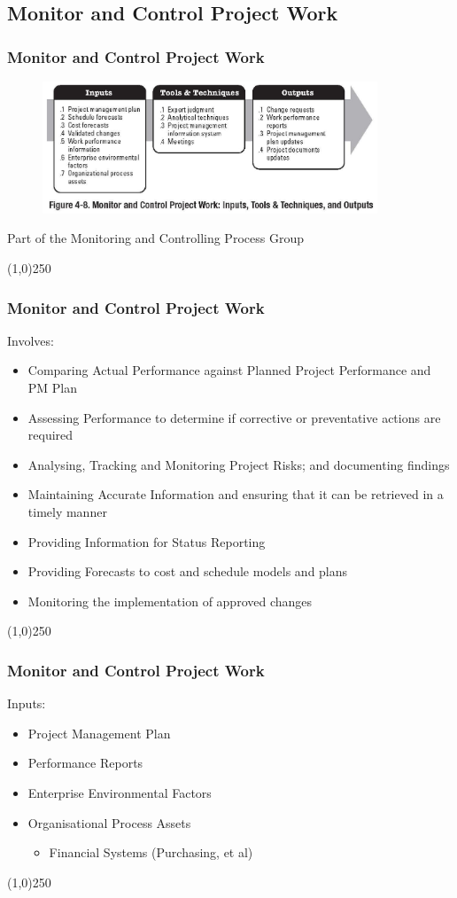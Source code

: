 \subsection{Monitor and Control Project Work}


\begin{frame}
\frametitle{Monitor and Control Project Work}
\begin{figure}
	\centering
		\includegraphics[width = 10cm]{images/Fig4-8.jpg}
	\label{fig:4-8}
\end{figure}Part of the Monitoring and Controlling Process Group
\end{frame}\begin{center}\line(1,0){250}\end{center}
%
%

\begin{frame}
\frametitle{Monitor and Control Project Work}
Involves:
\begin{itemize}
	\item Comparing Actual Performance against Planned Project Performance and PM Plan
	\item Assessing Performance to determine if corrective or preventative actions are required
	\item Analysing, Tracking and Monitoring Project Risks; and documenting findings
	\item Maintaining Accurate Information and ensuring that it can be retrieved in a timely manner
	\item Providing Information for Status Reporting
	\item Providing Forecasts to cost and schedule models and plans
	\item Monitoring the implementation of approved changes
\end{itemize}
\end{frame}\begin{center}\line(1,0){250}\end{center}
%
%
\begin{frame}
\frametitle{Monitor and Control Project Work}
Inputs:
\begin{itemize}
	\item Project Management Plan
	\item Performance Reports
	\item Enterprise Environmental Factors
	\item Organisational Process Assets
	\begin{itemize}
		\item Financial Systems (Purchasing, et al)
	\end{itemize}
\end{itemize}
\end{frame}\begin{center}\line(1,0){250}\end{center}
%
%


